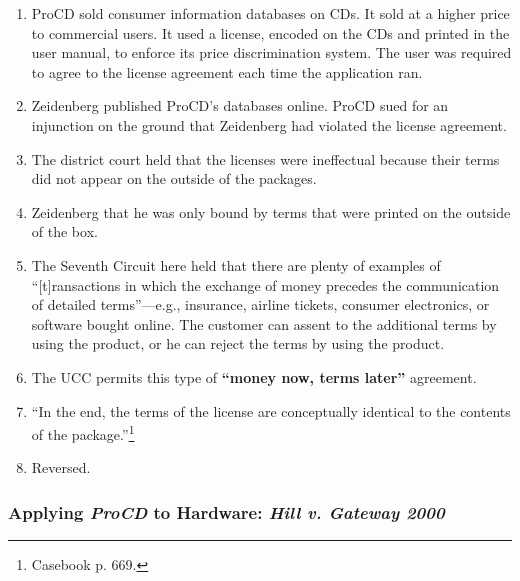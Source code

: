 \begin{enumerate}
    \item ProCD sold consumer information databases on CDs. It sold at a 
    higher price to commercial users. It used a license, encoded on the CDs 
    and printed in the user manual, to enforce its price discrimination 
    system. The user was required to agree to the license agreement each time 
    the application ran.
    \item Zeidenberg published ProCD's databases online. ProCD sued for an 
    injunction on the ground that Zeidenberg had violated the license 
    agreement.
    \item The district court held that the licenses were ineffectual because 
    their terms did not appear on the outside of the packages.
    \item Zeidenberg that he was only bound by terms that were printed on the 
    outside of the box.
    \item The Seventh Circuit here held that there are plenty of examples of 
    ``[t]ransactions in which the exchange of money precedes the communication 
    of detailed terms''---e.g., insurance, airline tickets, consumer 
    electronics, or software bought online. The customer can assent to the 
    additional terms by using the product, or he can reject the terms by using 
    the product.
    \item The UCC permits this type of \textbf{``money now, terms later''} 
    agreement.
    \item ``In the end, the terms of the license are conceptually identical to 
    the contents of the package.''\footnote{Casebook p. 669.}
    \item Reversed.
\end{enumerate}

\subsubsection{Applying \emph{ProCD} to Hardware: \emph{Hill v. Gateway 2000}}

